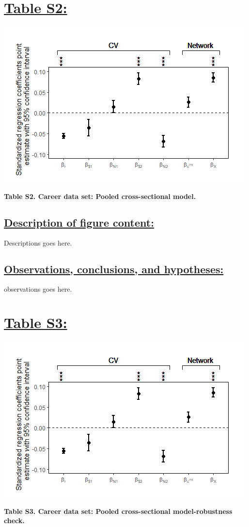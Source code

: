 \documentclass{article}\usepackage[]{graphicx}\usepackage[]{color}
\begin{document}
\section*{\underline{Table S2:}}
\begin{center}
\includegraphics[scale=0.8]{4.png}
\newline
\par{\textbf{Table S2. Career data set: Pooled cross-sectional model.}}
\end{center}
\subsection*{\underline{Description of figure content:}}
\par{
Descriptions goes here.
}
\subsection*{\underline{Observations, conclusions, and hypotheses:}}
\par{
observations goes here.
}

\newpage
\section*{\underline{Table S3:}}
\begin{center}
\includegraphics[scale=0.8]{4.png}
\newline
\par{\textbf{Table S3. Career data set: Pooled cross-sectional model-robustness check.}}
\end{center}
\end{document}

